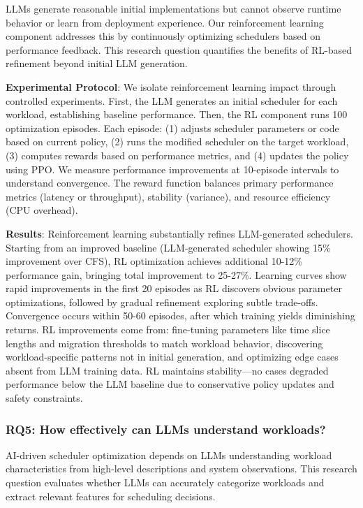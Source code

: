 LLMs generate reasonable initial implementations but cannot observe runtime behavior or learn from deployment experience. Our reinforcement learning component addresses this by continuously optimizing schedulers based on performance feedback. This research question quantifies the benefits of RL-based refinement beyond initial LLM generation.

\textbf{Experimental Protocol}: We isolate reinforcement learning impact through controlled experiments. First, the LLM generates an initial scheduler for each workload, establishing baseline performance. Then, the RL component runs 100 optimization episodes. Each episode: (1) adjusts scheduler parameters or code based on current policy, (2) runs the modified scheduler on the target workload, (3) computes rewards based on performance metrics, and (4) updates the policy using PPO. We measure performance improvements at 10-episode intervals to understand convergence. The reward function balances primary performance metrics (latency or throughput), stability (variance), and resource efficiency (CPU overhead).


\textbf{Results}: Reinforcement learning substantially refines LLM-generated schedulers. Starting from an improved baseline (LLM-generated scheduler showing 15\% improvement over CFS), RL optimization achieves additional 10-12\% performance gain, bringing total improvement to 25-27\%. Learning curves show rapid improvements in the first 20 episodes as RL discovers obvious parameter optimizations, followed by gradual refinement exploring subtle trade-offs. Convergence occurs within 50-60 episodes, after which training yields diminishing returns. RL improvements come from: fine-tuning parameters like time slice lengths and migration thresholds to match workload behavior, discovering workload-specific patterns not in initial generation, and optimizing edge cases absent from LLM training data. RL maintains stability—no cases degraded performance below the LLM baseline due to conservative policy updates and safety constraints.

\subsubsection{RQ5: How effectively can LLMs understand workloads?}

AI-driven scheduler optimization depends on LLMs understanding workload characteristics from high-level descriptions and system observations. This research question evaluates whether LLMs can accurately categorize workloads and extract relevant features for scheduling decisions.

